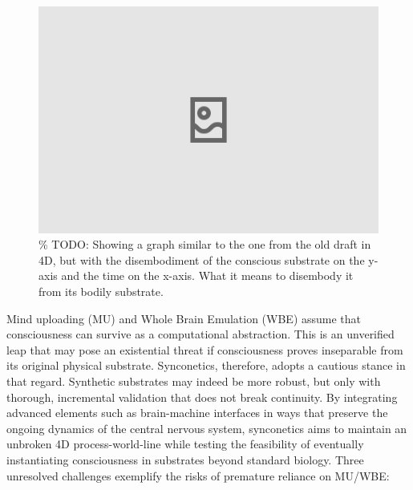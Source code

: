\documentclass[10pt]{article}
\begin{document}
\begin{sloppypar}
  \begin{figure}[ht!]
    \centering
    \includegraphics[width=\textwidth]{figures/4d-trajectory-disembodiment.png}
    \caption{\% TODO: Showing a graph similar to the one from the old draft in 4D, but with the disembodiment of the conscious substrate on the y-axis and the time on the x-axis. What it means to disembody it from its bodily substrate.}
    \label{fig:4d-trajectory-disembodiment}
  \end{figure}

  Mind uploading (MU) and Whole Brain Emulation (WBE) assume that consciousness can survive as a computational abstraction. This is an unverified leap that may pose an existential threat if consciousness proves inseparable from its original physical substrate. Synconetics, therefore, adopts a cautious stance in that regard. Synthetic substrates may indeed be more robust, but only with thorough, incremental validation that does not break continuity. By integrating advanced elements such as brain-machine interfaces in ways that preserve the ongoing dynamics of the central nervous system, synconetics aims to maintain an unbroken 4D process-world-line while testing the feasibility of eventually instantiating consciousness in substrates beyond standard biology. Three unresolved challenges exemplify the risks of premature reliance on MU/WBE:


\end{sloppypar}
\end{document}
